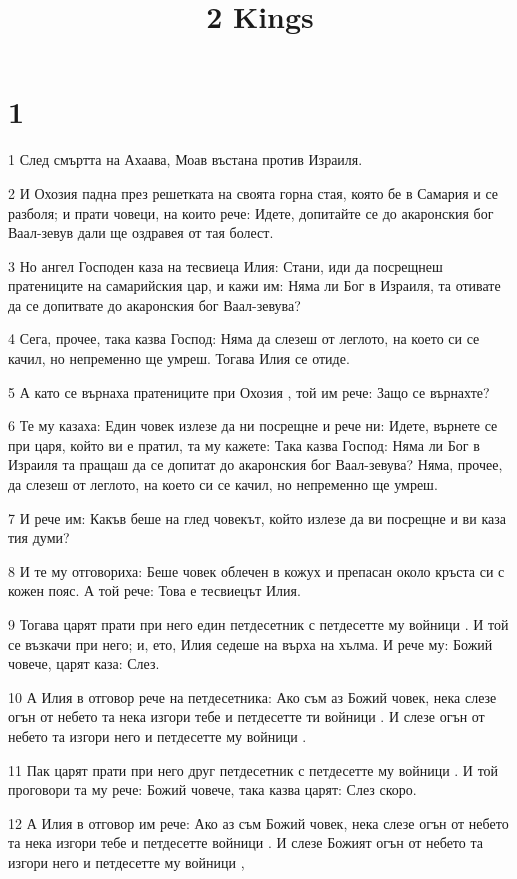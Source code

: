 

\title{2 Kings}


\chapter{1}

\par 1 След смъртта на Ахаава, Моав въстана против Израиля.
\par 2 И Охозия падна през решетката на своята горна стая, която бе в Самария и се разболя; и прати човеци, на които рече: Идете, допитайте се до акаронския бог Ваал-зевув дали ще оздравея от тая болест.
\par 3 Но ангел Господен каза на тесвиеца Илия: Стани, иди да посрещнеш пратениците на самарийския цар, и кажи им: Няма ли Бог в Израиля, та отивате да се допитвате до акаронския бог Ваал-зевува?
\par 4 Сега, прочее, така казва Господ: Няма да слезеш от леглото, на което си се качил, но непременно ще умреш. Тогава Илия се отиде.
\par 5 А като се върнаха пратениците при Охозия , той им рече: Защо се върнахте?
\par 6 Те му казаха: Един човек излезе да ни посрещне и рече ни: Идете, върнете се при царя, който ви е пратил, та му кажете: Така казва Господ: Няма ли Бог в Израиля та пращаш да се допитат до акаронския бог Ваал-зевува? Няма, прочее, да слезеш от леглото, на което си се качил, но непременно ще умреш.
\par 7 И рече им: Какъв беше на глед човекът, който излезе да ви посрещне и ви каза тия думи?
\par 8 И те му отговориха: Беше човек облечен в кожух и препасан около кръста си с кожен пояс. А той рече: Това е тесвиецът Илия.
\par 9 Тогава царят прати при него един петдесетник с петдесетте му войници . И той се възкачи при него; и, ето, Илия седеше на върха на хълма. И рече му: Божий човече, царят каза: Слез.
\par 10 А Илия в отговор рече на петдесетника: Ако съм аз Божий човек, нека слезе огън от небето та нека изгори тебе и петдесетте ти войници . И слезе огън от небето та изгори него и петдесетте му войници .
\par 11 Пак царят прати при него друг петдесетник с петдесетте му войници . И той проговори та му рече: Божий човече, така казва царят: Слез скоро.
\par 12 А Илия в отговор им рече: Ако аз съм Божий човек, нека слезе огън от небето та нека изгори тебе и петдесетте войници . И слезе Божият огън от небето та изгори него и петдесетте му войници ,
